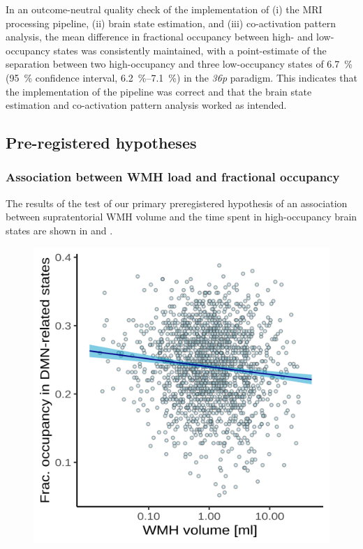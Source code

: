 In an outcome-neutral quality check of the implementation of (i) the MRI processing pipeline, (ii) brain state estimation, and (iii) co-activation pattern analysis, the mean difference in fractional occupancy between high- and low-occupancy states was consistently maintained, with a point-estimate of the separation between two high-occupancy and three low-occupancy states of \qty{6.7}{\percent} (\qty{95}{\percent} confidence interval, \qtyrange{6.2}{7.1}{\percent}) in the \emph{36p} paradigm. 
This indicates that the implementation of the pipeline was correct and that the brain state estimation and co-activation pattern analysis worked as intended. 


\subsection{Pre-registered hypotheses}
\subsubsection{Association between WMH load and fractional occupancy}
The results of the test of our primary preregistered hypothesis of an association between supratentorial WMH volume and the time spent in high-occupancy brain states are shown in  and .

\begin{figure}
    \includegraphics[width=.5\linewidth]{./../analysis/derivatives/Figures/Fig_hyp1.png}
    \label{fig:hyp1}
\end{figure}

